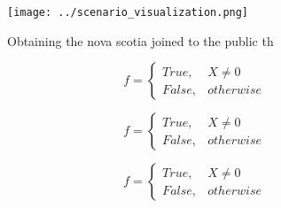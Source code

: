 \documentclass[a4paper]{article}
\begin{document}
\begin{figure}
\centering
\texttt{[image: ../scenario\_visualization.png]}
\caption{Obtaining the nova scotia joined to the public th
}
\end{figure}
 
\begin{equation}   f =
\begin{cases} True, & X \neq 0\\
False, & otherwise
\end{cases}
\end{equation}

\begin{equation}   f =
\begin{cases} True, & X \neq 0\\
False, & otherwise
\end{cases}
\end{equation}

\begin{equation}   f =
\begin{cases} True, & X \neq 0\\
False, & otherwise
\end{cases}
\end{equation}
\end{document}

